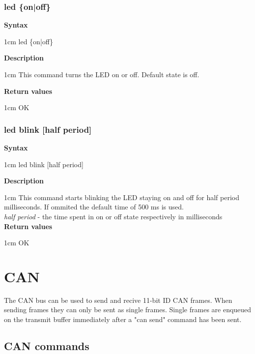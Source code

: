\documentclass{article}[a4paper]
\begin{document}
\subsubsection{led \{on|off\}}
\begin{tcolorbox}
	{\bf Syntax}

	 1cm \dimexpr\linewidth-2cm\relax
	led \{on|off\}

	\medskip
	{\bf Description}

	 1cm \dimexpr\linewidth-2cm\relax
	This command turns the LED on or off.
	Default state is off.

	\medskip
	{\bf Return values}

	 1cm \dimexpr\linewidth-2cm\relax
	OK
\end{tcolorbox}

\subsubsection{led blink [half period]}
\begin{tcolorbox}
	{\bf Syntax}

	 1cm \dimexpr\linewidth-2cm\relax
	led blink [half period]

	\medskip
	{\bf Description}

	 1cm \dimexpr\linewidth-2cm\relax
	This command starts blinking the LED staying on and off for half period
	milliseconds. If ommited the default time of 500 ms is used.
	\medskip \\
	{\it half period} - the time spent in on or off state respectively in milliseconds \\

	\medskip
	{\bf Return values}

	 1cm \dimexpr\linewidth-2cm\relax
	OK
\end{tcolorbox}

\section{CAN}
The CAN bus can be used to send and recive 11-bit ID CAN frames.
When sending frames they can only be sent as single frames. Single frames are
enqueued on the transmit buffer immediately after a "can send" command has been sent.

\subsection{CAN commands}
\end{document}
